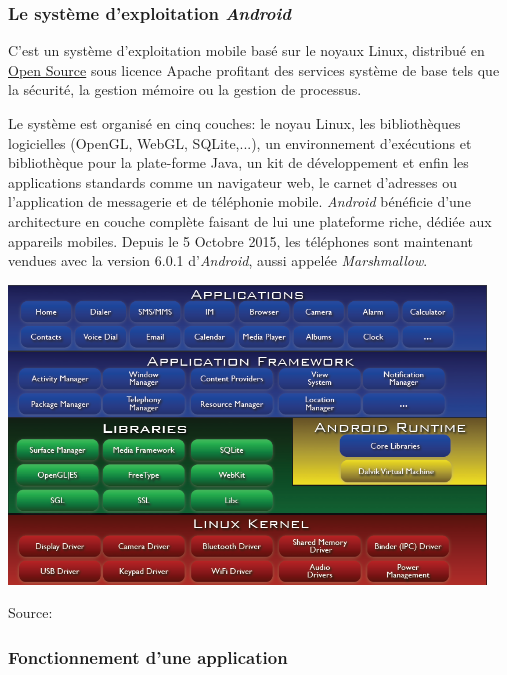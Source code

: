 \subsubsection{Le système d'exploitation \emph{Android}} C'est un système d'exploitation mobile basé sur le noyaux Linux, distribué en \underline{Open Source} sous licence Apache\cite{Apache} profitant des services système de base tels que la sécurité, la gestion mémoire ou la gestion de processus.

Le système est organisé en cinq couches: le noyau Linux, les bibliothèques logicielles (OpenGL, WebGL, SQLite,...), un environnement d'exécutions et bibliothèque pour la plate-forme Java, un kit de développement et enfin les applications standards comme un navigateur web, le carnet d'adresses ou l'application de messagerie et de téléphonie mobile.
\textit{Android} bénéficie d'une architecture en couche complète faisant de lui une plateforme riche, dédiée aux appareils mobiles. Depuis le 5 Octobre 2015, les téléphones sont maintenant vendues avec la version 6.0.1 d'\textit{Android}, aussi appelée \textit{Marshmallow}. 

\begin{center}
\includegraphics[height=300px]{Assets/androidArchi.png}
\begin{flushleft}
\hspace*{15pt}\hbox{\scriptsize Source:}
\end{flushleft}

\end{center}

\subsubsection{Fonctionnement d'une application}

